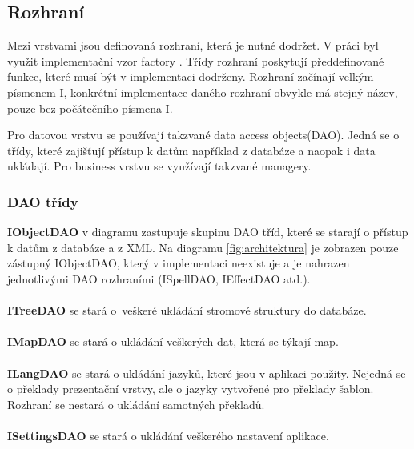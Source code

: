 \documentclass[thesis=B,czech]{resources/FITthesis}[2012/06/26]
\begin{document}
\subsection{Rozhraní}
Mezi vrstvami jsou definovaná rozhraní, která je nutné dodržet. V práci byl využit implementační vzor factory \cite{factory}. Třídy rozhraní poskytují předdefinované funkce, které musí být v implementaci dodrženy. Rozhraní začínají velkým písmenem I, konkrétní implementace daného rozhraní obvykle má stejný název, pouze bez počátečního písmena I.\par

Pro datovou vrstvu se používají takzvané \clqq data access objects\crqq (DAO). Jedná se o třídy, které zajišťují přístup k datům například z databáze a naopak i data ukládají. Pro business vrstvu se využívají takzvané \clqq managery\crqq .\par


\subsubsection*{DAO třídy}
\noindent\textbf{IObjectDAO} v diagramu zastupuje skupinu DAO tříd, které se starají o přístup k datům z databáze a z XML. Na diagramu \ref{fig:architektura} je zobrazen pouze zástupný IObjectDAO, který v implementaci neexistuje a je nahrazen jednotlivými DAO rozhraními (ISpellDAO, IEffectDAO atd.).\\
\\
\textbf{ITreeDAO} se stará o~veškeré ukládání stromové struktury do databáze. \\
\\
\textbf{IMapDAO} se stará o ukládání veškerých dat, která se týkají map. \\
\\
\textbf{ILangDAO} se stará o ukládání jazyků, které jsou v aplikaci použity. Nejedná se o překlady prezentační vrstvy, ale o jazyky vytvořené pro překlady šablon. Rozhraní se nestará o ukládání samotných překladů.\\
\\
\textbf{ISettingsDAO} se stará o ukládání veškerého nastavení aplikace. 
\end{document}
